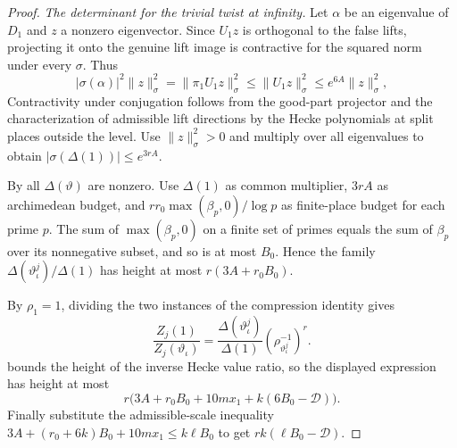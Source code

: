 \begin{proof}
\emph{The determinant for the trivial twist at infinity.}
Let $\alpha$ be an eigenvalue of $D_1$ and $z$ a nonzero eigenvector. Since $U_1 z$ is orthogonal to the false lifts, projecting it onto the genuine lift image is contractive for the squared norm under every $\sigma$. Thus
\[
 |\sigma(\alpha)|^2\|z\|_\sigma^2
   =\|\pi_1 U_1 z\|_\sigma^2\le\|U_1 z\|_\sigma^2
   \le e^{6A}\|z\|_\sigma^2 ,
\]
Contractivity under conjugation follows from the good-part projector and the characterization of admissible lift directions by the Hecke polynomials at split places outside the level.
Use $\|z\|_\sigma^2>0$ and multiply over all eigenvalues to obtain $|\sigma(\Delta(1))|\le e^{3rA}$.

By  all $\Delta(\vartheta)$ are nonzero. Use $\Delta(1)$ as common multiplier, $3rA$ as archimedean budget, and $rr_0\max(\beta_p,0)/\log p$ as finite-place budget for each prime $p$. The sum of $\max(\beta_p,0)$ on a finite set of primes equals the sum of $\beta_p$ over its nonnegative subset, and so is at most $B_0$. Hence the family $\Delta(\vartheta_\iota^j)/\Delta(1)$ has height at most $r(3A+r_0 B_0)$.

By $\rho_1=1$, dividing the two instances of the compression identity gives
\[
 \frac{Z_j(1)}{Z_j(\vartheta_\iota)}
   =\frac{\Delta(\vartheta_\iota^j)}{\Delta(1)}
       \left(\rho_{\vartheta_\iota^j}^{-1}\right)^r .
\]
 bounds the height of the inverse Hecke value ratio, so the displayed expression has height at most
\[
 r\bigl(3A+r_0 B_0+10mx_1+k(6B_0-\mathcal D)\bigr).
\]
Finally substitute the admissible-scale inequality $3A+(r_0+6k)B_0+10mx_1\le k\ell B_0$ to get $rk(\ell B_0-\mathcal D)$.
\end{proof}
